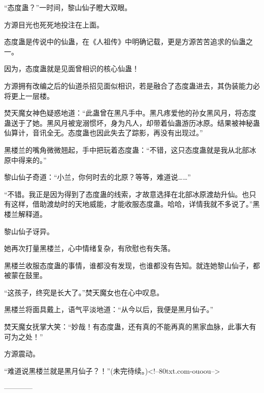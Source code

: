 \begin{this_body}
“态度蛊？”一时间，黎山仙子瞪大双眼。

方源目光也死死地投注在上面。

态度蛊是传说中的仙蛊，在《人祖传》中明确记载，更是方源苦苦追求的仙蛊之一。

因为，态度蛊就是见面曾相识的核心仙蛊！

方源拥有改编之后的仙道杀招见面似相识，若是融合了态度蛊进去，其伪装能力必将更上一层楼。

焚天魔女神色疑惑地道：“此蛊曾在黑凡手中。黑凡疼爱他的孙女黑风月，将态度蛊送于了她。黑风月被宠溺惯坏，身为凡人，却带着仙蛊游历冰原。结果被神秘蛊仙算计，音讯全无。态度蛊也因此失去了踪影，再没有出现过。”

黑楼兰的嘴角微微翘起，手中把玩着态度蛊：“不错，这只态度蛊就是我从北部冰原中得来的。”

黎山仙子奇道：“小兰，你何时去的北原？等等，难道说……”

“不错。我正是因为得到了态度蛊的线索，才故意选择在北部冰原渡劫升仙。也只有这样，借助渡劫时的天地威能，才能收服态度蛊。哈哈，详情我就不多说了。”黑楼兰解释道。

黎山仙子讶异。

她再次打量黑楼兰，心中情绪复杂，有欣慰也有失落。

黑楼兰收服态度蛊的事情，谁都没有发现，也谁都没有告知。就连她黎山仙子，都被蒙在鼓里。

“这孩子，终究是长大了。”焚天魔女也在心中叹息。

黑楼兰将面具戴上，语气平淡地道：“从今以后，我便是黑月仙子。”

焚天魔女抚掌大笑：“妙哉！有态度蛊，还有真的不能再真的黑家血脉，此事大有可为之处！”

方源震动。

“难道说黑楼兰就是黑月仙子？！”(未完待续。)<!--80txt.com-ouoou-->

------------

\end{this_body}

